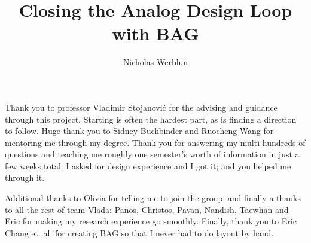 \documentclass[masters]{ucbthesis}
\begin{document}

\title{Closing the Analog Design Loop with BAG}
\author{Nicholas Werblun}


\maketitle
\copyrightpage



\begin{frontmatter}



\tableofcontents
\clearpage
\listoffigures
\clearpage

\begin{acknowledgements}
Thank you to professor Vladimir Stojanovi\'c for the advising and guidance through this project. Starting is often the hardest part, as is finding a direction to follow. Huge thank you to Sidney Buchbinder and Ruocheng Wang for mentoring me through my degree. Thank you for answering my multi-hundreds of questions and teaching me roughly one semester's worth of information in just a few weeks total.  I asked for design experience and I got it; and you helped me through it.

Additional thanks to Olivia for telling me to join the group, and finally a thanks to all the rest of team Vlada: Panos, Christos, Pavan, Nandish, Taewhan and Eric for making my research experience go smoothly. Finally, thank you to Eric Chang et. al. for creating BAG so that I never had to do layout by hand.

\end{acknowledgements}

\end{frontmatter}
\pagestyle{headings}
\end{document}

